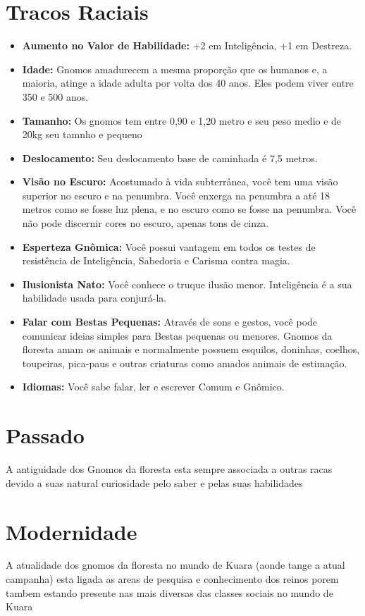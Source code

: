 \documentclass{book}
\begin{document}
\section{Tracos Raciais}
\begin{itemize}
    \item \textbf{Aumento no Valor de Habilidade:} +2 em Inteligência, +1 em Destreza.
    \item \textbf{Idade:} Gnomos amadurecem a mesma proporção que os humanos e, a 
          maioria, atinge a idade adulta por volta dos 40 anos. Eles podem viver 
          entre 350 e 500 anos.
    \item \textbf{Tamanho:} Os gnomos tem entre 0,90 e 1,20 metro e seu peso medio e de
          20kg  seu tamnho e pequeno
    \item \textbf{Deslocamento:} Seu deslocamento base de caminhada é 7,5 metros.
    \item \textbf{Visão no Escuro:} Acostumado à vida subterrânea, você tem uma visão superior 
          no escuro e na penumbra. Você enxerga na penumbra a até 18 metros como se fosse
          luz plena, e no escuro como se fosse na penumbra. Você não pode discernir cores no 
          escuro, apenas tons de cinza.
    \item \textbf{Esperteza Gnômica:} Você possui vantagem em todos os testes de resistência 
          de Inteligência, Sabedoria e Carisma contra magia.
    \item \textbf{Ilusionista Nato:} Você conhece o truque ilusão menor. Inteligência é a sua 
          habilidade usada para conjurá-la.
    \item \textbf{Falar com Bestas Pequenas:} Através de sons e gestos, você pode comunicar  
          ideias simples para Bestas pequenas ou menores. Gnomos da floresta amam os
          animais e normalmente possuem esquilos, doninhas, coelhos, toupeiras, pica-paus 
          e outras criaturas como amados animais de estimação.
    \item \textbf{Idiomas:} Você sabe falar, ler e escrever Comum e Gnômico.
\end{itemize}
\section{Passado}
A antiguidade dos Gnomos da floresta esta sempre associada a outras racas devido a suas 
natural curiosidade pelo saber e pelas suas habilidades 
\section{Modernidade}
A atualidade dos gnomos da floresta no mundo de Kuara (aonde tange a atual campanha) esta
ligada as areas de pesquisa e conhecimento dos reinos porem tambem estando presente nas 
mais diversas das classes sociais no mundo de Kuara 
\end{document}
